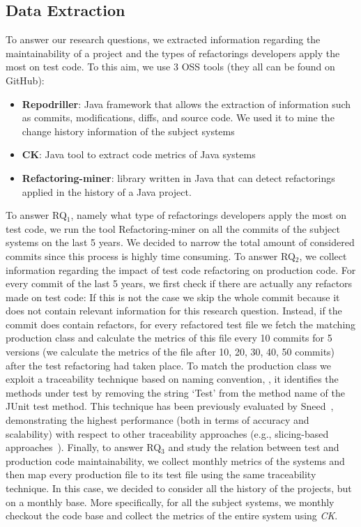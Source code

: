 \subsection{Data Extraction}
\label{data-extraction}
To answer our research questions, we extracted information regarding the maintainability of a project and the types of refactorings developers apply the most on test code. To this aim, we use 3 OSS tools (they all can be found on GitHub): 
\begin{itemize}
    \item \textbf{Repodriller}: Java framework that allows the extraction of information such as commits, modifications, diffs, and source code. We used it to mine the change history information of the subject systems
    \item \textbf{CK}: Java tool to extract code metrics of Java systems
    \item \textbf{Refactoring-miner}: library written in Java that can detect refactorings applied in the history of a Java project.
\end{itemize}

To answer RQ$_1$, namely what type of refactorings developers apply the most on test code, we run the tool Refactoring-miner on all the commits of the subject systems on the last 5 years. We decided to narrow the total amount of considered commits since this process is highly time consuming. 
To answer RQ$_2$, we collect information regarding the impact of test code refactoring on production code. For every commit of the last 5 years, we first check if there are actually any refactors made on test code: If this is not the case we skip the whole commit because it does not contain relevant information for this research question. Instead, if the commit does contain refactors, for every refactored test file we fetch the matching production class and calculate the metrics of this file every 10 commits for 5 versions (\ie we calculate the metrics of the file after 10, 20, 30, 40, 50 commits) after the test refactoring had taken place. To match the production class we exploit a traceability technique based on naming convention, \ie, it identifies the methods under test by removing the string ‘Test’ from the method name of the JUnit test method. This technique has been previously evaluated by Sneed~\cite{sneed2004reverse}, demonstrating the highest performance (both in terms of accuracy and scalability) with respect to other traceability approaches (e.g., slicing-based approaches~\cite{qusef2014recovering}). 
Finally, to answer RQ$_3$ and study the relation between test and production code maintainability, we collect monthly metrics of the systems and then map every production file to its test file using the same traceability technique. In this case, we decided to consider all the history of the projects, but on a monthly base. More specifically, for all the subject systems, we monthly checkout the code base and collect the metrics of the entire system using \emph{CK}.

